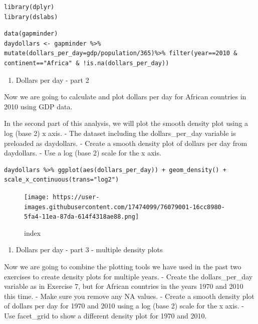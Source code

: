 \documentclass[
]{article}
\providecommand{\tightlist}{%
  \setlength{\itemsep}{0pt}\setlength{\parskip}{0pt}}
\begin{document}
\begin{verbatim}
library(dplyr)
library(dslabs)
\end{verbatim}

\begin{verbatim}
data(gapminder)
daydollars <- gapminder %>% mutate(dollars_per_day=gdp/population/365)%>% filter(year==2010 & continent=="Africa" & !is.na(dollars_per_day))
\end{verbatim}

\begin{enumerate}
\def\labelenumi{\arabic{enumi}.}
\setcounter{enumi}{7}
\tightlist
\item
  Dollars per day - part 2
\end{enumerate}

Now we are going to calculate and plot dollars per day for African
countries in 2010 using GDP data.

In the second part of this analysis, we will plot the smooth density
plot using a log (base 2) x axis. - The dataset including the
dollars\_per\_day variable is preloaded as daydollars. - Create a smooth
density plot of dollars per day from daydollars. - Use a log (base 2)
scale for the x axis.

\begin{verbatim}
daydollars %>% ggplot(aes(dollars_per_day)) + geom_density() + scale_x_continuous(trans="log2")
\end{verbatim}

\begin{figure}
\centering
\texttt{[image: https://user-images.githubusercontent.com/17474099/76079001-16cc8980-5fa4-11ea-87da-614f4318ae88.png]}
\caption{index}
\end{figure}

\begin{enumerate}
\def\labelenumi{\arabic{enumi}.}
\setcounter{enumi}{8}
\tightlist
\item
  Dollars per day - part 3 - multiple density plots
\end{enumerate}

Now we are going to combine the plotting tools we have used in the past
two exercises to create density plots for multiple years. - Create the
dollars\_per\_day variable as in Exercise 7, but for African countries
in the years 1970 and 2010 this time. - Make sure you remove any NA
values. - Create a smooth density plot of dollars per day for 1970 and
2010 using a log (base 2) scale for the x axis. - Use facet\_grid to
show a different density plot for 1970 and 2010.
\end{document}
